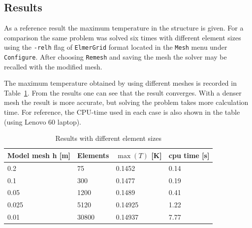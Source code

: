 \subsection*{Results}

As a reference result the maximum temperature in the structure is given. For a
comparison the same problem was solved six times with different
element sizes using the \texttt{-relh} flag of \texttt{ElmerGrid} format located in the
\texttt{Mesh} menu under \texttt{Configure}. After choosing \texttt{Remesh} and saving the mesh 
the solver may be recalled with the modified mesh.

The maximum temperature obtained by using different
meshes is recorded in Table~\ref{tb:res1}.  From the results one
can see that the result converges. With a denser mesh the result is
more accurate, but solving the problem takes more calculation time.
For reference, the CPU-time used in each case is
also shown in the table (using Lenovo 60 laptop).

\begin{table}[h]
\caption{Results with different element sizes}
\label{tb:res1}
\begin{center}
\begin{tabular}{llll} \hline
Model mesh h [m] & Elements & $\max (T)$ [K] & cpu time [s]\\ \hline
0.2 & 75 &  0.1452  & 0.14 \\
0.1 &  300 & 0.1477  & 0.19 \\
0.05 & 1200 & 0.1489  & 0.41 \\ 
0.025 & 5120 & 0.14925 & 1.22 \\ 
0.01  & 30800 & 0.14937 & 7.77 \\ \hline
\end{tabular}
\end{center}
\end{table}

\hfill
\mbox{}






